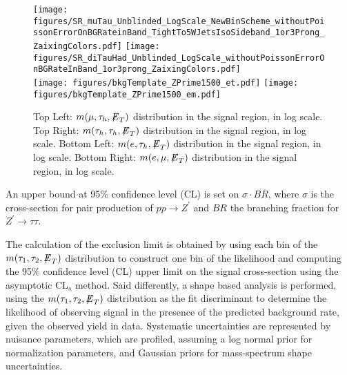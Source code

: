 \begin{figure}[tbh!]
  \centering
   \texttt{[image: figures/SR\_muTau\_Unblinded\_LogScale\_NewBinScheme\_withoutPoissonErrorOnBGRateinBand\_TightTo5WJetsIsoSideband\_1or3Prong\_ZaixingColors.pdf]}
   \texttt{[image: figures/SR\_diTauHad\_Unblinded\_LogScale\_withoutPoissonErrorOnBGRateInBand\_1or3prong\_ZaixingColors.pdf]} \\
   \texttt{[image: figures/bkgTemplate\_ZPrime1500\_et.pdf]}
   \texttt{[image: figures/bkgTemplate\_ZPrime1500\_em.pdf]}
  \caption{ Top Left: $m(\mu,\tau_{h},{\not\mathrel{E}}_T)$ distribution in the signal region, in log scale.  Top Right: $m(\tau_{h},\tau_{h},{\not\mathrel{E}}_T)$ distribution in 
the signal region, in log scale.  Bottom Left: $m(e,\tau_{h},{\not\mathrel{E}}_T)$ distribution in the signal region, in log scale.  Bottom Right: $m(e,\mu,{\not\mathrel{E}}_T)$ 
distribution in the signal region, in log scale.}
    \label{fig:SignalRegionPlot_a}
\end{figure}


An upper bound at 95\% confidence level (CL) is set on $\sigma \cdot BR$, 
where $\sigma$ is the cross-section for pair production of $pp\to Z^{\prime}$ and $BR$ the branching fraction for $Z^{\prime}\to\tau\tau$.

The calculation of the exclusion limit is obtained by using each bin of the $m(\tau_{1},\tau_{2},{\not\mathrel{E}}_T)$ distribution to construct one bin of the likelihood 
and computing the 95\% confidence level (CL) upper limit on the signal cross-section using the asymptotic CL$_{s}$ method. 
Said differently, a shape based analysis is performed, using the $m(\tau_{1},\tau_{2},{\not\mathrel{E}}_T)$ distribution as the fit discriminant to determine the 
likelihood of observing signal in the presence of the predicted background rate, given the observed yield in data. Systematic uncertainties are represented by nuisance parameters, which are profiled, assuming a log normal prior for normalization parameters, and Gaussian priors for mass-spectrum shape uncertainties.


